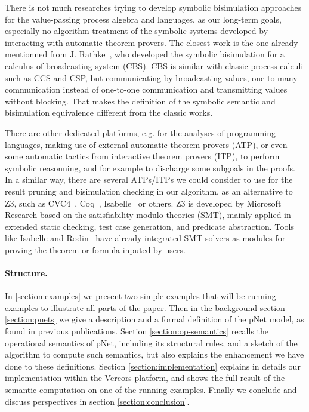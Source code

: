 \documentclass{lncs/llncs}
\newcommand{\TODO}[1]{\textcolor{red}{\textbf{[TODO:#1]}}}
\begin{document}

There is not much researches trying to develop symbolic bisimulation approaches
for the value-passing process algebra and languages, as our long-term goals,
especially no algorithm treatment of the symbolic systems developed by
interacting with automatic theorem provers. The closest work is the
one already mentionned from J. Rathke~\cite{HennessyRathke:TCS98},
who developed the symbolic bisimulation for a
calculus of broadcasting system (CBS). CBS is similar with classic
process calculi such as CCS and CSP, but communicating by broadcasting
values, one-to-many communication instead of one-to-one communication
and transmitting values without blocking. That makes the definition of
the symbolic semantic and bisimulation equivalence different from the
classic works.

There are other dedicated platforms, e.g. for the analyses of 
programming languages, making use of external automatic theorem
provers (ATP), or even some automatic tactics from interactive theorem
provers (ITP), to perform symbolic reasonning, and for example to
discharge some subgoals in the proofs.
In a similar way, there are several ATPs/ITPs we could consider to use for
the result pruning and bisimulation checking in our algorithm, as an
alternative to Z3, such as CVC4~\cite{barrett:CAV2011}, Coq~\cite{armand:CPP2011,besson:CPP2011},
Isabelle~\cite{blanchette:FroCoS2011} or others. Z3 is
developed by Microsoft Research based on the satisfiability modulo
theories (SMT), mainly applied in extended static checking, test case
generation, and predicate abstraction. Tools like Isabelle and
Rodin~\cite{deharbe2013,deharbe2014,abrial2007} have already integrated SMT solvers as modules for proving the
theorem or formula inputed by users. 

\paragraph{Structure.}
In \ref{section:examples} we present two simple examples that will be
running examples to illustrate all parts of the paper. Then in the
background section
\ref{section:pnets} we give a description and a formal definition of
the pNet model, as found in previous publications.
Section \ref{section:op-semantics} recalls the operational semantics
of pNet, including its structural rules, and a sketch of the algorithm
to compute such semantics, but also explains the enhancement we have
done to these definitions.
Section \ref{section:implementation} explains in details our
implementation within the Vercors platform, and shows the full result of
the semantic computation on one of the running examples.
Finally we conclude and discuss perspectives in section
\ref{section:conclusion}. 
\end{document}
